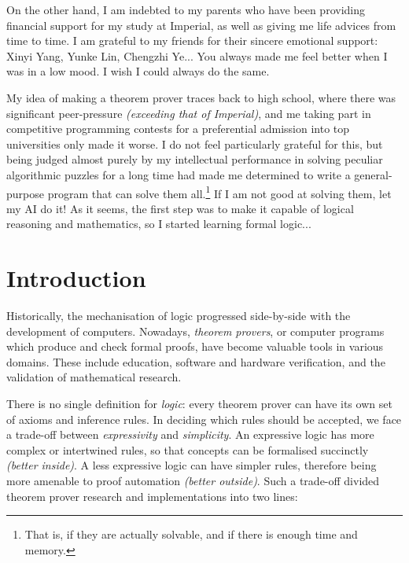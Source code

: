 \documentclass[twoside]{report}
\begin{document}
On the other hand, I am indebted to my parents who have been providing financial support for my study at Imperial, as well as giving me life advices from time to time. I am grateful to my friends for their sincere emotional support: Xinyi Yang, Yunke Lin, Chengzhi Ye... You always made me feel better when I was in a low mood. I wish I could always do the same.

\vspace{1em}

My idea of making a theorem prover traces back to high school, where there was significant peer-pressure \emph{(exceeding that of Imperial)}, and me taking part in competitive programming contests for a preferential admission into top universities only made it worse. I do not feel particularly grateful for this, but being judged almost purely by my intellectual performance in solving peculiar algorithmic puzzles for a long time had made me determined to write a general-purpose program that can solve them all.\footnote{That is, if they are actually solvable, and if there is enough time and memory.} If I am not good at solving them, let my AI do it! As it seems, the first step was to make it capable of logical reasoning and mathematics, so I started learning formal logic...

\setcounter{page}{0}

\doublespacing
\tableofcontents
\singlespacing

\chapter{Introduction}
\label{sec:introduction}

Historically, the mechanisation of logic progressed side-by-side with the development of computers. Nowadays, \emph{theorem provers}, or computer programs which produce and check formal proofs, have become valuable tools in various domains. These include education, software and hardware verification, and the validation of mathematical research.

There is no single definition for \emph{logic}: every theorem prover can have its own set of axioms and inference rules. In deciding which rules should be accepted, we face a trade-off between \emph{expressivity} and \emph{simplicity}. An expressive logic has more complex or intertwined rules, so that concepts can be formalised succinctly \emph{(better inside)}. A less expressive logic can have simpler rules, therefore being more amenable to proof automation \emph{(better outside)}. Such a trade-off divided theorem prover research and implementations into two lines:
\end{document}
